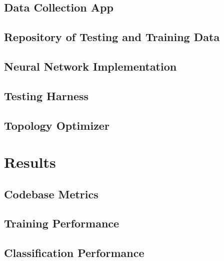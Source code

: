 \documentclass{article}
\begin{document}
\subsection{Data Collection App}

\subsection{Repository of Testing and Training Data}

\subsection{Neural Network Implementation}

\subsection{Testing Harness}

\subsection{Topology Optimizer}


\section{Results}

\subsection{Codebase Metrics}


\subsection{Training Performance}


\subsection{Classification Performance}

\end{document}
